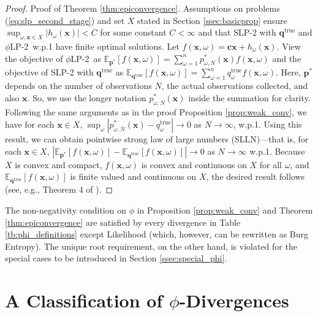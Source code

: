 \documentclass[opre,nonblindrev]{informs3} %
\newcommand{\E}{\mathbb{E}}
\renewcommand{\ee}[2]{\E_{#1} \left[ #2 \right]}
\newcommand{\x}{\mathbf{x}}
\renewcommand{\c}{\mathbf{c}}
\newcommand{\q}{\mathbf{q}}
\newcommand{\p}{\mathbf{p}}
\newcommand{\qtrue}{\q^{\text{true}}}
\newcommand{\plp}{$\phi$LP-2}
\begin{document}
\begin{proof}{\sc Proof of Theorem \ref{thm:epiconvergence}.}
	Assumptions on problems (\ref{eq:slp_second_stage}) and set $X$ stated in Section \ref{ssec:basicprop} ensure $\sup_{\omega, \x \in X}|h_\omega(\x)|<C$ for some constant $C<\infty$ and that SLP-2 with $\qtrue$ and  \plp\ w.p.1 have finite optimal solutions.  
   Let $f(\x,\omega)=\c\x + h_\omega(\x)$. 
	View the objective of \plp\ as $\ee{\p^*}{f(\x,\omega)}=\sum_{\omega=1}^{n}p^*_{\omega,N}(\x) f(\x,\omega)$ and the objective of SLP-2 with $\qtrue$ as $\ee{\qtrue}{f(\x,\omega)}=\sum_{\omega=1}^{n}q^{\text{true}}_\omega f(\x,\omega)$. 
	Here, $\p^*$ depends on the number of observations $N$, the actual observations collected, and also $\x$. 
	So, we use the longer notation $p^*_{\omega,N}(\x)$ inside the summation for clarity.
	Following the same arguments as in the proof Proposition \ref{prop:weak_conv}, we have for each $\x \in X$, $\sup_\omega |p^*_{\omega, N}(\x) - q^{\text{true}}_\omega| \rightarrow 0$ as $N \rightarrow \infty$, w.p.1. 
	Using this result, we can obtain pointwise strong law of large numbers (SLLN)---that is, for each $\x  \in X$, $|\ee{\p^*}{f(\x,\omega)}-\ee{\qtrue}{f(\x,\omega)}|\rightarrow 0$ as $N\rightarrow \infty$ w.p.1. 
	Because $X$ is convex and compact, $f(\x,\omega)$ is convex and continuous on $X$ for all $\omega$, and $\ee{\qtrue}{f(\x,\omega)}$ is finite valued and continuous on $X$, the desired result follows (see, e.g., Theorem 4 of \cite{shapiro_03}). 
    \Halmos
\end{proof}




The non-negativity condition on $\phi$ in Proposition \ref{prop:weak_conv} and Theorem \ref{thm:epiconvergence} are satisfied by every divergence in Table \ref{tb:phi_definitions} except Likelihood (which, however, can be rewritten as Burg Entropy).
The unique root requirement, on the other hand, is violated for the special cases to be introduced in Section \ref{ssec:special_phi}.

\section{A Classification of $\phi$-Divergences}
\label{sec:classification}
\end{document}
